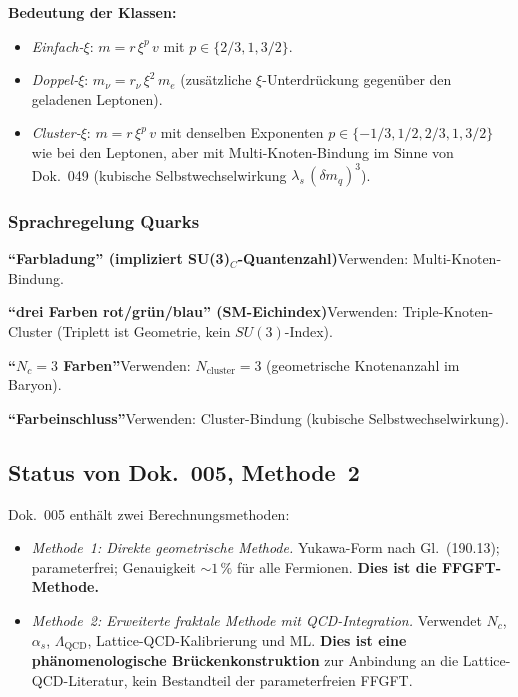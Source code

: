 \medskip


\textbf{Bedeutung der Klassen:}
\begin{itemize}
  \item \emph{Einfach-$\xi$}: $m = r\,\xi^p\,v$ mit $p \in \{2/3, 1, 3/2\}$.
  \item \emph{Doppel-$\xi$}: $m_\nu = r_\nu\,\xi^2\,m_e$
        (zusätzliche $\xi$-Unterdrückung gegenüber den geladenen Leptonen).
  \item \emph{Cluster-$\xi$}: $m = r\,\xi^p\,v$ mit denselben Exponenten
        $p \in \{-1/3, 1/2, 2/3, 1, 3/2\}$ wie bei den Leptonen, aber mit
        Multi-Knoten-Bindung im Sinne von Dok.~049 (kubische
        Selbstwechselwirkung $\lambda_s\,(\delta m_q)^3$).
\end{itemize}

\subsubsection*{Sprachregelung Quarks}

\smallskip\noindent \textbf{\enquote{Farbladung} (impliziert SU(3)$_C$-Quantenzahl)}\quad Verwenden: Multi-Knoten-Bindung.

\smallskip\noindent \textbf{\enquote{drei Farben rot/grün/blau} (SM-Eichindex)}\quad Verwenden: Triple-Knoten-Cluster (Triplett ist Geometrie, kein $SU(3)$-Index).

\smallskip\noindent \textbf{\enquote{$N_c = 3$ Farben}}\quad Verwenden: $N_{\text{cluster}} = 3$ (geometrische Knotenanzahl im Baryon).

\smallskip\noindent \textbf{\enquote{Farbeinschluss}}\quad Verwenden: Cluster-Bindung (kubische Selbstwechselwirkung).

\medskip


\subsection*{Status von Dok.~005, Methode~2}

Dok.~005 enthält zwei Berechnungsmethoden:
\begin{itemize}
  \item \emph{Methode~1: Direkte geometrische Methode.} Yukawa-Form
        nach Gl.~(190.13); parameterfrei; Genauigkeit $\sim 1\,\%$
        für alle Fermionen. \textbf{Dies ist die FFGFT-Methode.}
  \item \emph{Methode~2: Erweiterte fraktale Methode mit
        QCD-Integration.} Verwendet $N_c$, $\alpha_s$,
        $\Lambda_{\text{QCD}}$, Lattice-QCD-Kalibrierung und ML.
        \textbf{Dies ist eine phänomenologische Brückenkonstruktion}
        zur Anbindung an die Lattice-QCD-Literatur, kein Bestandteil
        der parameterfreien FFGFT.
\end{itemize}

